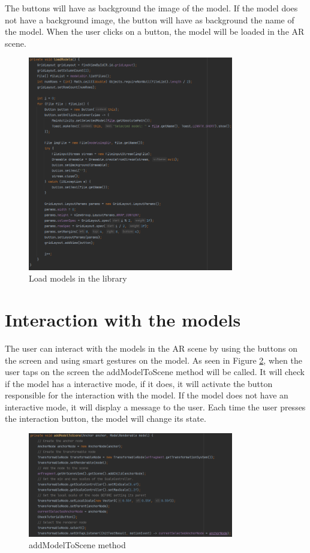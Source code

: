 The buttons will have as background the image of the model. If the model does not have a background image, the button will have as background the name of the model. When the user clicks on a button, the model will be loaded in the \ac{AR} scene.

\begin{figure}[H]
    \centering
    \includegraphics[width=0.8\textwidth]{img/code/loadModels.png}
    \caption{Load models in the library}
    \label{fig:loadModels}
\end{figure}

\newpage
\section{Interaction with  the models}
The user can interact with the models in the \ac{AR} scene by using the buttons on the screen and using smart gestures on the model. As seen in Figure \ref{fig:addModeltoScene}, when the user taps on the screen the addModelToScene method will be called. It will check if the model has a interactive mode, if it does, it will activate the button responsible for the interaction with the model. If the model does not have an interactive mode, it will display a message to the user. Each time the user presses the interaction button, the model will change its state.

\begin{figure}[H]
    \centering
    \includegraphics[width=0.8\textwidth]{img/code/addModelToScene.png}
    \caption{addModelToScene method}
    \label{fig:addModeltoScene}
\end{figure}

